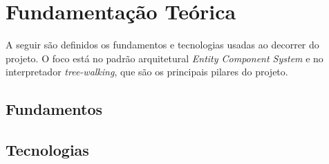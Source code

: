 \chapter{Fundamentação Teórica}\label{ch:fundamentacao}

A seguir são definidos os fundamentos e tecnologias usadas ao decorrer do projeto. O foco está no padrão arquitetural \textit{Entity Component System} e no interpretador \textit{tree-walking}, que são os principais pilares do projeto.

\section{Fundamentos}











\section{Tecnologias}






